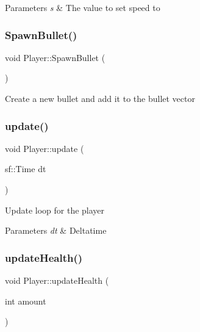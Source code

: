 \begin{DoxyParams}{Parameters}
{\em s} & The value to set speed to\\
\hline
\end{DoxyParams}
\mbox{\label{class_player_a00aa77d7a95a64308cd5e1967b6aa5db}} 
\subsubsection{\texorpdfstring{SpawnBullet()}{SpawnBullet()}}
{\footnotesize\ttfamily void Player\+::\+Spawn\+Bullet (\begin{DoxyParamCaption}{ }\end{DoxyParamCaption})}



Create a new bullet and add it to the bullet vector 

\mbox{\label{class_player_aef595f7b4ef7419815b79e80ea0ea0b8}} 
\subsubsection{\texorpdfstring{update()}{update()}}
{\footnotesize\ttfamily void Player\+::update (\begin{DoxyParamCaption}\item[{sf\+::\+Time}]{dt }\end{DoxyParamCaption})}



Update loop for the player 


\begin{DoxyParams}{Parameters}
{\em dt} & Deltatime\\
\hline
\end{DoxyParams}
\mbox{\label{class_player_a080378b41ec0a6b25496cf1664a9a676}} 
\subsubsection{\texorpdfstring{updateHealth()}{updateHealth()}}
{\footnotesize\ttfamily void Player\+::update\+Health (\begin{DoxyParamCaption}\item[{int}]{amount }\end{DoxyParamCaption})}



